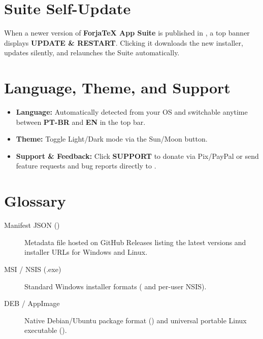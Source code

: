 \documentclass[11pt,a4paper]{article}
\begin{document}
\section{Suite Self-Update}
When a newer version of \textbf{ForjaTeX App Suite} is published in , a top banner displays \textbf{UPDATE \& RESTART}. Clicking it downloads the new installer, updates silently, and relaunches the Suite automatically.

\section{Language, Theme, and Support}
\begin{itemize}
  \item \textbf{Language:} Automatically detected from your OS and switchable anytime between \textbf{PT-BR} and \textbf{EN} in the top bar.
  \item \textbf{Theme:} Toggle Light/Dark mode via the Sun/Moon button.
  \item \textbf{Support \& Feedback:} Click \textbf{SUPPORT} to donate via Pix/PayPal or send feature requests and bug reports directly to .
\end{itemize}

\section{Glossary}
\begin{description}
  \item[Manifest JSON ()] Metadata file hosted on GitHub Releases listing the latest versions and installer URLs for Windows and Linux.
  \item[MSI / NSIS (.exe)] Standard Windows installer formats ( and per-user NSIS).
  \item[DEB / AppImage] Native Debian/Ubuntu package format () and universal portable Linux executable ().
\end{description}
\end{document}
